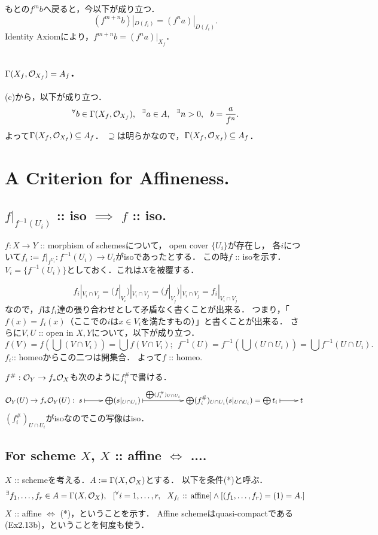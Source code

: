 \documentclass[a4paper]{jsarticle}
\begin{document}
    もとの$f^m b$へ戻ると，今以下が成り立つ．
    \[ (f^{m+n} b)|_{D(f_i)}=(f^n a)|_{D(f_i)}. \]
    Identity Axiomにより，$f^{m+n} b=(f^n a)|_{X_f}$．

    \subsection{$\Gamma(X_f, \mathcal{O}_{X_f})=A_{f}$.}
    (c)から，以下が成り立つ．
    \[ {}^{\forall} b \in \Gamma(X_f, \mathcal{O}_{X_f}),~~ {}^{\exists} a \in A,~~ {}^{\exists} n>0,~~ b=\frac{a}{f^n}. \]
    よって$\Gamma(X_f, \mathcal{O}_{X_f}) \subseteq A_f$．
    $\supseteq$は明らかなので，$\Gamma(X_f, \mathcal{O}_{X_f}) \subseteq A_f$．

\section{A Criterion for Affineness.} %
    \subsection{$f|_{f^{-1}(U_i)}$ :: iso $\implies$ $f$ :: iso.}
    $f: X \to Y$ :: morphism of schemesについて，
    open cover $\{U_i\}$が存在し，
    各$i$について$f_i:=f|_{f^{U_i}}: f^{-1}(U_i) \to U_i$がisoであったとする．
    この時$f$ :: isoを示す．
    $V_i=\{f^{-1}(U_i)\}$としておく．これは$X$を被覆する．

    \[ f_i|_{V_i \cap V_j}=(f|_{V_i})|_{V_i \cap V_j}=(f|_{V_j})|_{V_i \cap V_j}=f_i|_{V_i \cap V_j} \]
    なので，$f$は$f_i$達の張り合わせとして矛盾なく書くことが出来る．
    つまり，「$f(x)=f_i(x)$（ここでの$i$は$x \in V_i$を満たすもの）」と書くことが出来る．
    さらに$V,U$ :: open in $X, Y$について，以下が成り立つ．
    \[ f(V)=f(\bigcup (V \cap V_i))=\bigcup f(V \cap V_i);~~ f^{-1}(U)=f^{-1}(\bigcup (U \cap U_i))=\bigcup f^{-1}(U \cap U_i). \]
    $f_i$:: homeoからこの二つは開集合．
    よって$f$ :: homeo.

    $f^{\#}: \mathcal{O}_{Y} \to f_* \mathcal{O}_{X}$も次のように$f_i^{\#}$で書ける．
    \[
        \shO_{Y}(U) \to f_* \shO_{Y}(U):
        \xymatrix{
        s \ar@{|->}[r]
        & \bigoplus (s|_{U \cap U_i}) \ar@{|->}[rr]^-{\bigoplus (f_i^{\#})_{U \cap U_i}}
        & {}
        & \bigoplus (f_i^{\#})_{U \cap U_i}(s|_{U \cap U_i})=\bigoplus t_i \ar@{|->}[r]
        & t
        }
    \]
    $(f_i^{\#})_{U \cap U_i}$がisoなのでこの写像はiso．

    \subsection{For scheme $X$, $X$ :: affine $\iff$ ....}
    $X$ :: schemeを考える．$A:=\Gamma(X, \mathcal{O}_X)$とする．
    以下を条件(*)と呼ぶ．
    \[ {}^{\exists} f_1, \dots, f_r \in A=\Gamma(X, \mathcal{O}_X),~~ [{}^{\forall} i=1,\dots,r,~~ X_{f_i} \text{ :: affine}] \land [(f_1,\dots,f_r)=(1)=A.] \]
    $X$ :: affine $\iff$ (*)，ということを示す．
    Affine schemeはquasi-compactである(Ex2.13b)，ということを何度も使う．
\end{document}
